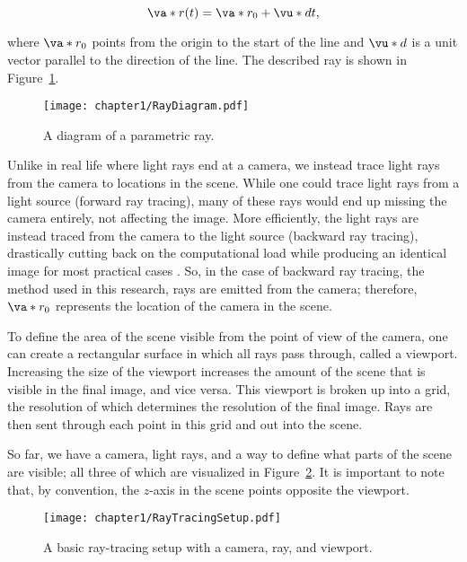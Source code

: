 \begin{equation}
\va*{r}(t) = \va*{r_0} + \vu*{d} t,
\label{eq:parametric_ray}
\end{equation}

\noindent where $\va*{r_0}$ points from the origin to the start of the line and $\vu*{d}$ is a unit vector parallel to the direction of the line. The described ray is shown in Figure~\ref{fig:ray_diagram}.\\

\begin{figure}[H]
    \centering
	\texttt{[image: chapter1/RayDiagram.pdf]}
	\caption{A diagram of a parametric ray.}
	\label{fig:ray_diagram}
\end{figure}

\par Unlike in real life where light rays end at a camera, we instead trace light rays from the camera to locations in the scene. While one could trace light rays from a light source (forward ray tracing), many of these rays would end up missing the camera entirely, not affecting the image. More efficiently, the light rays are instead traced from the camera to the light source (backward ray tracing), drastically cutting back on the computational load while producing an identical image for most practical cases \cite{Peddie}. So, in the case of backward ray tracing, the method used in this research, rays are emitted from the camera; therefore, $\va*{r_0}$ represents the location of the camera in the scene.

\par To define the area of the scene visible from the point of view of the camera, one can create a rectangular surface in which all rays pass through, called a viewport. Increasing the size of the viewport increases the amount of the scene that is visible in the final image, and vice versa. This viewport is broken up into a grid, the resolution of which determines the resolution of the final image. Rays are then sent through each point in this grid and out into the scene.

\par So far, we have a camera, light rays, and a way to define what parts of the scene are visible; all three of which are visualized in Figure~\ref{fig:basic_ray_tracing_setup}. It is important to note that, by convention, the $z$-axis in the scene points opposite the viewport.

\begin{figure}[H]
  \centering
\texttt{[image: chapter1/RayTracingSetup.pdf]}
\caption{A basic ray-tracing setup with a camera, ray, and viewport.}
\label{fig:basic_ray_tracing_setup}
\end{figure}

